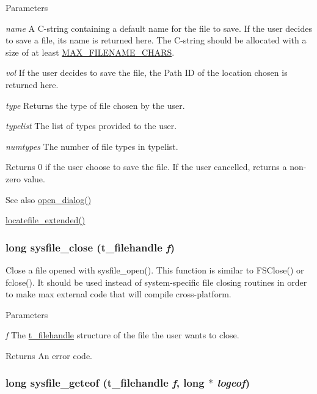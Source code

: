 \begin{DoxyParams}{Parameters}
\item[{\em name}]A C-\/string containing a default name for the file to save. If the user decides to save a file, its name is returned here. The C-\/string should be allocated with a size of at least \hyperlink{group__files_ga481556de2ccf516a499525edebc45ee8}{MAX\_\-FILENAME\_\-CHARS}.\item[{\em vol}]If the user decides to save the file, the Path ID of the location chosen is returned here.\item[{\em type}]Returns the type of file chosen by the user. \item[{\em typelist}]The list of types provided to the user. \item[{\em numtypes}]The number of file types in typelist.\end{DoxyParams}
\begin{DoxyReturn}{Returns}
0 if the user choose to save the file. If the user cancelled, returns a non-\/zero value.
\end{DoxyReturn}
\begin{DoxySeeAlso}{See also}
\hyperlink{group__files_ga0d8fd0b13e2e623298a45e846af3fe1a}{open\_\-dialog()} 

\hyperlink{group__files_gaa2899b66e1457da0ee333f9407230ccd}{locatefile\_\-extended()} 
\end{DoxySeeAlso}
\hypertarget{group__files_gad17b977bcb191648c2856d589c45f0d4}{
\subsubsection[{sysfile\_\-close}]{\setlength{\rightskip}{0pt plus 5cm}long sysfile\_\-close ({\bf t\_\-filehandle} {\em f})}}
\label{group__files_gad17b977bcb191648c2856d589c45f0d4}


Close a file opened with sysfile\_\-open(). This function is similar to FSClose() or fclose(). It should be used instead of system-\/specific file closing routines in order to make max external code that will compile cross-\/platform.


\begin{DoxyParams}{Parameters}
\item[{\em f}]The \hyperlink{group__files_gafcb776aa74d514754e83b30995b5a5d1}{t\_\-filehandle} structure of the file the user wants to close. \end{DoxyParams}
\begin{DoxyReturn}{Returns}
An error code. 
\end{DoxyReturn}
\hypertarget{group__files_ga0523b180c53fc3e0b5766abc58dc6172}{
\subsubsection[{sysfile\_\-geteof}]{\setlength{\rightskip}{0pt plus 5cm}long sysfile\_\-geteof ({\bf t\_\-filehandle} {\em f}, \/  long $\ast$ {\em logeof})}}
\label{group__files_ga0523b180c53fc3e0b5766abc58dc6172}


